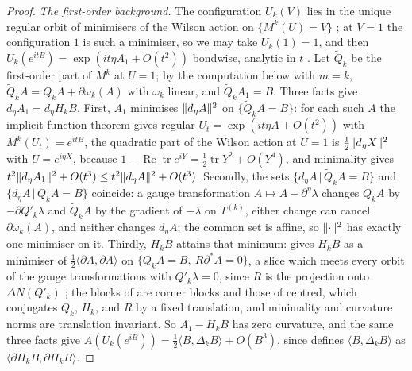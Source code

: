 \documentclass[11pt]{preprint}
\newcommand{\tr}{\operatorname{tr}}
\DeclarePairedDelimiter{\norm}{\lVert}{\rVert}
\numberwithin{equation}{section}
\theoremstyle{definition}
\theoremstyle{remark}
\theoremstyle{plain}
\begin{document}
\begin{proof}
\emph{The first-order background.} The configuration $U_k(V)$ lies in the unique regular orbit of minimisers of the Wilson action on $\{ M^k(U) = V \}$ \cite[(0.21)--(0.22), p.~256]{BalabanRG1}; at $V = 1$ the configuration $1$ is such a minimiser, so we may take $U_k(1) = 1$, and then $U_k(e^{itB}) = \exp(it\eta A_1 + O(t^2))$ bondwise, analytic in $t$ \cite[Sect.~G]{BalabanVAR}. Let $\tilde Q_k$ be the first-order part of $M^k$ at $U = 1$; by the computation below with $m = k$, $\tilde Q_kA = Q_kA + \partial\omega_k(A)$ with $\omega_k$ linear, and $\tilde Q_kA_1 = B$. Three facts give $d_\eta A_1 = d_\eta H_kB$. First, $A_1$ minimises $\norm{d_\eta A}^2$ on $\{ \tilde Q_kA = B \}$: for each such $A$ the implicit function theorem gives regular $U_t = \exp(it\eta A + O(t^2))$ with $M^k(U_t) = e^{itB}$, the quadratic part of the Wilson action at $U = 1$ is $\frac12\norm{d_\eta X}^2$ with $U = e^{i\eta X}$, because $1 - \operatorname{Re}\tr e^{iY} = \frac12\tr Y^2 + O(Y^4)$, and minimality gives $t^2\norm{d_\eta A_1}^2 + O(t^3) \leq t^2\norm{d_\eta A}^2 + O(t^3)$. Secondly, the sets $\{ d_\eta A \, | \, \tilde Q_kA = B \}$ and $\{ d_\eta A \, | \, Q_kA = B \}$ coincide: a gauge transformation $A \mapsto A - \partial^\eta\lambda$ changes $Q_kA$ by $-\partial Q'_k\lambda$ \cite[(1.20), p.~20]{BalabanPRT1} and $\tilde Q_kA$ by the gradient of $-\lambda$ on $T^{(k)}$, either change can cancel $\partial\omega_k(A)$, and neither changes $d_\eta A$; the common set is affine, so $\norm{\cdot}^2$ has exactly one minimiser on it. Thirdly, $H_kB$ attains that minimum: \cite[p.~29]{BalabanPRT1} gives $H_kB$ as a minimiser of $\frac12\langle\partial A, \partial A\rangle$ on $\{ Q_kA = B,\ R\partial^*A = 0 \}$, a slice which meets every orbit of the gauge transformations with $Q'_k\lambda = 0$, since $R$ is the projection onto $\Delta N(Q'_k)$ \cite[p.~25]{BalabanPRT1}; the blocks of \cite{BalabanPRT1} are corner blocks \cite[p.~18]{BalabanPRT1} and those of \cite{BalabanRG1} centred, which conjugates $Q_k$, $H_k$, and $R$ by a fixed translation, and minimality and curvature norms are translation invariant. So $A_1 - H_kB$ has zero curvature, and the same three facts give $A(U_k(e^{iB})) = \frac12\langle B, \Delta_kB \rangle + O(B^3)$, since \cite[p.~29]{BalabanPRT1} defines $\langle B, \Delta_kB \rangle$ as $\langle\partial H_kB, \partial H_kB\rangle$.


\end{proof}
\end{document}
